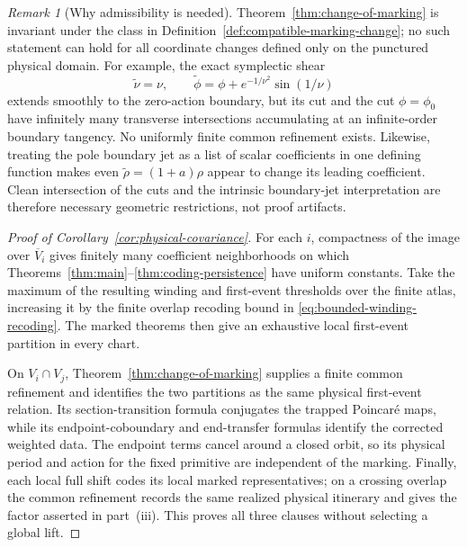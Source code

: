 \documentclass[11pt]{amsart}
\numberwithin{equation}{section}
\theoremstyle{definition}
\theoremstyle{remark}
\newtheorem{remark}[theorem]{Remark}
\begin{document}
\begin{remark}[Why admissibility is needed]
Theorem~\ref{thm:change-of-marking} is invariant under the class in
Definition~\ref{def:compatible-marking-change}; no such statement can hold
for all coordinate changes defined only on the punctured physical domain.
For example, the exact
symplectic shear
\[
 \widetilde\nu=\nu,\qquad
 \widetilde\phi=\phi+e^{-1/\nu^2}\sin(1/\nu)
\]
extends smoothly to the zero-action boundary, but its cut and the cut
$\phi=\phi_0$ have
infinitely many transverse intersections accumulating at an infinite-order
boundary tangency.  No uniformly finite common refinement exists.
Likewise, treating the pole boundary jet as a list of scalar coefficients
in one defining function makes even
$\widetilde\rho=(1+a)\rho$ appear to change its leading coefficient.
Clean intersection of the cuts and the intrinsic boundary-jet
interpretation are therefore necessary geometric restrictions, not
proof artifacts.
\end{remark}

\begin{proof}[Proof of Corollary~\ref{cor:physical-covariance}]
For each $i$, compactness of the image over $\overline V_i$ gives finitely
many coefficient neighborhoods on which
Theorems~\ref{thm:main}--\ref{thm:coding-persistence} have uniform
constants.  Take the maximum of the resulting winding and first-event
thresholds over the finite atlas, increasing it by the finite overlap
recoding bound in \eqref{eq:bounded-winding-recoding}.  The marked
theorems then give an exhaustive local first-event partition in every
chart.

On $V_i\cap V_j$, Theorem~\ref{thm:change-of-marking} supplies a finite
common refinement and identifies the two partitions as the same physical
first-event relation.  Its section-transition formula conjugates the
trapped Poincar\'e maps, while its endpoint-coboundary and end-transfer
formulas identify the corrected weighted data.  The endpoint terms cancel
around a closed orbit, so its physical period and action for the fixed
primitive are independent of the marking.  Finally, each local full shift
codes its local marked representatives; on a crossing overlap the common
refinement records the same realized physical itinerary and gives the
factor asserted in part~\textup{(iii)}.  This proves all three clauses
without selecting a global lift.
\end{proof}
\end{document}
